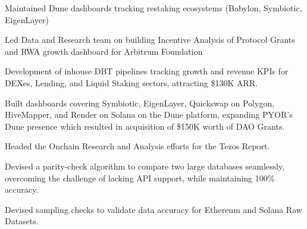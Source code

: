     \begin{zitemize}
        \item Maintained Dune dashboards tracking restaking ecosystems (Babylon, Symbiotic, EigenLayer)
        \item Led Data and Research team on building Incentive Analysis of Protocol Grants and RWA growth dashboard for Arbitrum Foundation
        \item Development of inhouse DBT pipelines tracking growth and revenue KPIs for DEXes, Lending, and Liquid Staking sectors, attracting \$130K ARR.
        \item Built dashboards covering Symbiotic, EigenLayer, Quickswap on Polygon, HiveMapper, and Render on Solana on the Dune platform, expanding PYOR's Dune presence which resulted in acquisition of \$150K worth of DAO Grants.
        \item Headed the Onchain Research and Analysis efforts for the Tezos Report.
        \item Devised a parity-check algorithm to compare two large databases seamlessly, overcoming the challenge of lacking API support, while maintaining 100\% accuracy.
        \item Devised sampling checks to validate data accuracy for Ethereum and Solana Raw Datasets.
    \end{zitemize}
